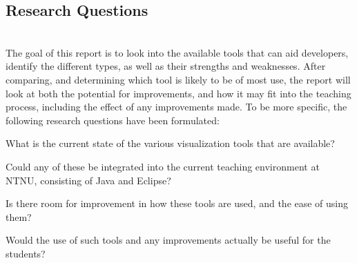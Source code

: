 \subsection{Research Questions}\label{intro-RQs}
~\\
The goal of this report is to look into the available tools that can aid developers, identify the different types, as well as their strengths and weaknesses.
After comparing, and determining which tool is likely to be of most use, the report will look at both the potential for improvements, and how it may fit into the teaching process, including the effect of any improvements made.
To be more specific, the following research questions have been formulated:
\begin{theorem}
What is the current state of the various visualization tools that are available?
\end{theorem}
\begin{theorem}
Could any of these be integrated into the current teaching environment at NTNU, consisting of Java and Eclipse?
\end{theorem}
\begin{theorem}
Is there room for improvement in how these tools are used, and the ease of using them?
\end{theorem}
\begin{theorem}
Would the use of such tools and any improvements actually be useful for the students?
\end{theorem}
